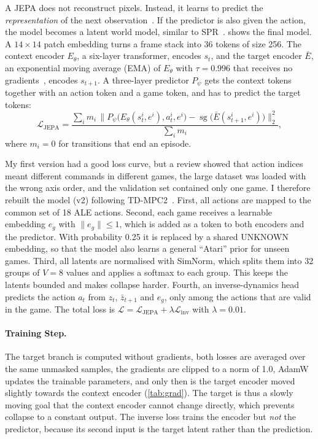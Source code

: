 \documentclass[runningheads]{llncs}
\begin{document}
A JEPA does not reconstruct pixels. Instead, it learns to predict the \emph{representation}
of the next observation~\cite{lecun2022path}. If the predictor is also given the action, the
model becomes a latent world model, similar to SPR~\cite{schwarzer2021spr}. 
shows the final model. A $14\times14$ patch embedding turns a frame stack into 36 tokens of
size 256. The context encoder $E_\theta$, a six-layer transformer, encodes $s_t$, and the
target encoder $\bar E$, an exponential moving average (EMA) of $E_\theta$ with $\tau=0.996$
that receives no gradients~\cite{assran2023ijepa}, encodes $s_{t+1}$. A three-layer predictor
$P_\psi$ gets the context tokens together with an action token and a game token, and has to
predict the target tokens:
\begin{equation}
  \mathcal{L}_{\text{JEPA}}=\frac{\sum_i m_i\,\big\|P_\psi\big(E_\theta(s_t^i,e^i),a_t^i,e^i\big)
  -\operatorname{sg}\big(\bar E(s_{t+1}^i,e^i)\big)\big\|_2^2}{\sum_i m_i},
\end{equation}
where $m_i=0$ for transitions that end an episode.

My first version had a good loss curve, but a review showed that action indices meant
different commands in different games, the large dataset was loaded with the wrong axis order,
and the validation set contained only one game.
I therefore rebuilt the model (v2) following TD-MPC2~\cite{hansen2024tdmpc2}. First, all actions are mapped to the common set of 18 ALE actions. Second, each game
receives a learnable embedding $e_g$ with $\|e_g\|\le1$, which is added as a token to both
encoders and the predictor. With probability 0.25 it is replaced by a shared UNKNOWN
embedding, so that the model also learns a general ``Atari'' prior for unseen games. Third, all
latents are normalised with SimNorm, which splits them into 32 groups of $V=8$ values and
applies a softmax to each group. This keeps the latents bounded and makes collapse harder. Fourth,
an inverse-dynamics head~\cite{pathak2017icm} predicts the action $a_t$ from $z_t$,
$\bar z_{t+1}$ and $e_g$, only among the actions that are valid in the game. The total loss is
$\mathcal{L}=\mathcal{L}_{\text{JEPA}}+\lambda\mathcal{L}_{\text{inv}}$ with $\lambda=0.01$.

\paragraph{Training Step.} The target branch is computed without gradients, both losses are
averaged over the same unmasked samples, the gradients are clipped to a norm of 1.0, AdamW
updates the trainable parameters, and only then is the target encoder moved slightly towards the context encoder (\cref{tab:grad}). The target is thus a slowly moving goal that the context encoder cannot change directly,
which prevents collapse to a constant output.
The inverse loss trains the encoder but \emph{not} the predictor, because its second input is
the target latent rather than the prediction.
\end{document}
